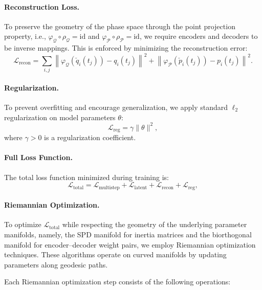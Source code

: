 \documentclass{article}
\theoremstyle{plain}
\theoremstyle{definition}
\theoremstyle{remark}
\begin{document}
\paragraph{Reconstruction Loss.}
To preserve the geometry of the phase space through the point projection property, i.e., $\varphi_{\mathcal{Q}} \circ \rho_{\mathcal{Q}} = \mathrm{id}$ and $\varphi_{\mathcal{P}} \circ \rho_{\mathcal{P}} = \mathrm{id}$, we require encoders and decoders to be inverse mappings. This is enforced by minimizing the reconstruction error:
\[
\mathcal{L}_{\text{recon}} = \sum_{i,j} \left\| \varphi_{\mathcal{Q}}(\check{q}_i(t_j)) - q_i(t_j) \right\|^2 + \left\| \varphi_{\mathcal{P}}(\check{p}_i(t_j)) - p_i(t_j) \right\|^2.
\]

\paragraph{Regularization.}
To prevent overfitting and encourage generalization, we apply standard $\ell_2$ regularization on model parameters $\theta$:
\[
\mathcal{L}_{\text{reg}} = \gamma \| \theta \|^2,
\]
where $\gamma > 0$ is a regularization coefficient.

\paragraph{Full Loss Function.}
The total loss function minimized during training is:
\[
\mathcal{L}_{\text{total}} =  \mathcal{L}_{\text{multistep}} +  \mathcal{L}_{\text{latent}} + \mathcal{L}_{\text{recon}} + \mathcal{L}_{\text{reg}},
\]


\paragraph{Riemannian Optimization.}
To optimize $\mathcal{L}_{\text{total}}$ while respecting the geometry of the underlying parameter manifolds, namely, the SPD manifold for inertia matrices and the biorthogonal manifold for encoder–decoder weight pairs, we employ Riemannian optimization techniques. These algorithms operate on curved manifolds by updating parameters along geodesic paths.

Each Riemannian optimization step consists of the following operations:
\end{document}
